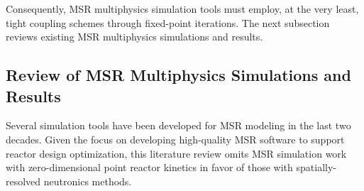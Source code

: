 Consequently, MSR multiphysics simulation tools must employ, at
the very least, tight coupling schemes through fixed-point iterations. The
next subsection reviews existing \gls{MSR} multiphysics simulations and results.

\subsection{Review of MSR Multiphysics Simulations and Results} \label{sec:msr-tools}

Several simulation tools have been developed for \gls{MSR} modeling in the last two decades. Given
the focus on developing high-quality \gls{MSR} software to support reactor design optimization,
this literature review omits MSR simulation work with zero-dimensional point reactor kinetics in
favor of those with spatially-resolved neutronics methods.

